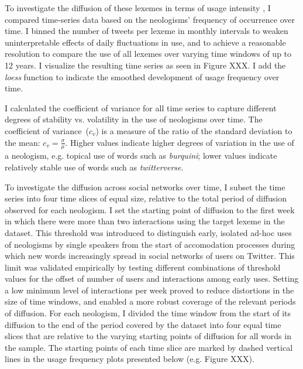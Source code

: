 \documentclass[
  a4paper,
  abstract=on,
  captions=tableabove
  ]{scrartcl}
\begin{document}
  To investigate the diffusion of these lexemes in terms of usage intensity \parencite{Stefanowitsch2017CorpusbasedPerspective}, I compared time-series data based on the neologisms' frequency of occurrence over time. I binned the number of tweets per lexeme in monthly intervals to weaken uninterpretable effects of daily fluctuations in use, and to achieve a reasonable resolution to compare the use of all lexemes over varying time windows of up to 12 years. I visualize the resulting time series as seen in Figure XXX. I add the \emph{loess} function to indicate the smoothed development of usage frequency over time.

  I calculated the coefficient of variance for all time series to capture different degrees of stability vs. volatility in the use of neologisms over time. The coefficient of variance~($c_{v}$) is a measure of the ratio of the standard deviation to the mean: $c_{v} = \frac{\sigma}{\mu}$. Higher values indicate higher degrees of variation in the use of a neologism, e.g. topical use of words such as \emph{burquini}; lower values indicate relatively stable use of words such as \emph{twitterverse}.

  To investigate the diffusion across social networks over time, I subset the time series into four time slices of equal size, relative to the total period of diffusion observed for each neologism. I set the starting point of diffusion to the first week in which there were more than two interactions using the target lexeme in the dataset. This threshold was introduced to distinguish early, isolated ad-hoc uses of neologisms by single speakers from the start of accomodation processes during which new words increasingly spread in social networks of users on Twitter. This limit was validated empirically by testing different combinations of threshold values for the offset of number of users and interactions among early uses. Setting a low minimum level of interactions per week proved to reduce distortions in the size of time windows, and enabled a more robust coverage of the relevant periods of diffusion. For each neologism, I divided the time window from the start of its diffusion to the end of the period covered by the dataset into four equal time slices that are relative to the varying starting points of diffusion for all words in the sample. The starting points of each time slice are marked by dashed vertical lines in the usage frequency plots presented below (e.g. Figure XXX).
\end{document}
